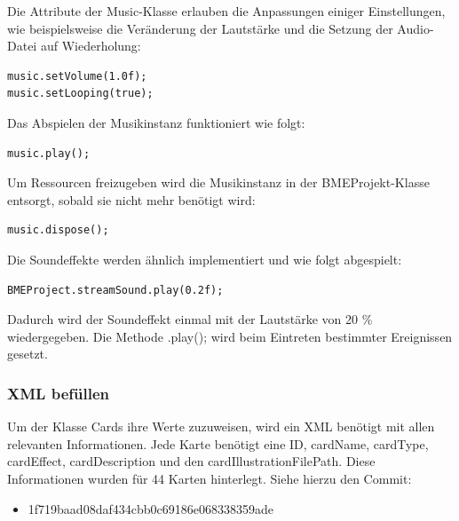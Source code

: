 Die Attribute der Music-Klasse erlauben die Anpassungen einiger Einstellungen, wie beispielsweise die Veränderung der Lautstärke und die Setzung der Audio-Datei auf Wiederholung:

\begin{lstlisting}
music.setVolume(1.0f);
music.setLooping(true);
\end{lstlisting}

Das Abspielen der Musikinstanz funktioniert wie folgt:

\begin{lstlisting}
music.play();
\end{lstlisting}

Um Ressourcen freizugeben wird die Musikinstanz in der BMEProjekt-Klasse entsorgt, sobald sie nicht mehr benötigt wird:

\begin{lstlisting}
music.dispose();
\end{lstlisting}

Die Soundeffekte werden ähnlich implementiert und wie folgt abgespielt: 
\begin{lstlisting}
BMEProject.streamSound.play(0.2f);
\end{lstlisting}

Dadurch wird der Soundeffekt einmal mit der Lautstärke von 20 \% wiedergegeben. Die Methode .play(); wird beim Eintreten bestimmter Ereignissen gesetzt.

\subsubsection{XML befüllen}
Um der Klasse Cards ihre Werte zuzuweisen, wird ein XML benötigt mit allen relevanten Informationen. Jede Karte benötigt eine ID, cardName, cardType, cardEffect, cardDescription und den cardIllustrationFilePath. Diese Informationen wurden für 44 Karten hinterlegt.
Siehe hierzu den Commit:
\begin{itemize}
\item 1f719baad08daf434cbb0c69186e068338359ade
\end{itemize}

